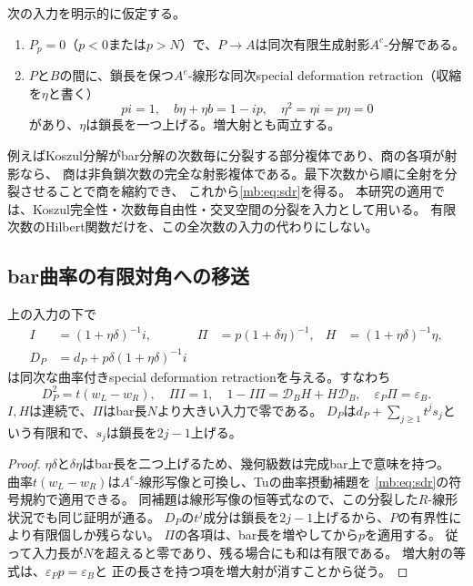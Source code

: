 次の入力を明示的に仮定する。
\begin{enumerate}
\item $P_p=0$（$p<0$または$p>N$）で、$P\to A$は同次有限生成射影$A^e$-分解である。
\item $P$と$B$の間に、鎖長を保つ$A^e$-線形な同次special deformation retraction（収縮を$\eta$と書く）
\begin{equation}\label{mb:eq:sdr}
 pi=1,\quad b\eta+\eta b=1-ip,\quad \eta^2=\eta i=p\eta=0
\end{equation}
があり、$\eta$は鎖長を一つ上げる。増大射とも両立する。
\end{enumerate}
例えばKoszul分解がbar分解の次数毎に分裂する部分複体であり、商の各項が射影なら、
商は非負鎖次数の完全な射影複体である。最下次数から順に全射を分裂させることで商を縮約でき、
これから\eqref{mb:eq:sdr}を得る。
本研究の適用では、Koszul完全性・次数毎自由性・交叉空間の分裂を入力として用いる。
有限次数のHilbert関数だけを、この全次数の入力の代わりにしない。

\subsection{bar曲率の有限対角への移送}
\begin{lemma}[有限支持に適合する曲率摂動]\label{mb:lem:perturbation}
上の入力の下で
\begin{align*}
 I&=(1+\eta\delta)^{-1}i,&
 \Pi&=p(1+\delta\eta)^{-1},&
 H&=(1+\eta\delta)^{-1}\eta,\\
 D_P&=d_P+p\delta(1+\eta\delta)^{-1}i
\end{align*}
は同次な曲率付きspecial deformation retractionを与える。すなわち
\[
 D_P^2=t(w_L-w_R),\quad \Pi I=1,\quad
 1-I\Pi=\mathcal D_BH+H\mathcal D_B,
 \quad \varepsilon_P\Pi=\varepsilon_B.
\]
$I,H$は連続で、$\Pi$はbar長$N$より大きい入力で零である。
$D_P$は$d_P+\sum_{j\ge1}t^j s_j$という有限和で、$s_j$は鎖長を$2j-1$上げる。
\end{lemma}
\begin{proof}
$\eta\delta$と$\delta\eta$はbar長を二つ上げるため、幾何級数は完成bar上で意味を持つ。
曲率$t(w_L-w_R)$は$A^e$-線形写像と可換し、Tuの曲率摂動補題を
\eqref{mb:eq:sdr}の符号規約で適用できる。
同補題は線形写像の恒等式なので、この分裂した$R$-線形状況でも同じ証明が通る。
$D_P$の$t^j$成分は鎖長を$2j-1$上げるから、$P$の有界性により有限個しか残らない。
$\Pi$の各項は、bar長を増やしてから$p$を適用する。
従って入力長が$N$を超えると零であり、残る場合にも和は有限である。
増大射の等式は、$\varepsilon_Pp=\varepsilon_B$と
正の長さを持つ項を増大射が消すことから従う。
\end{proof}

